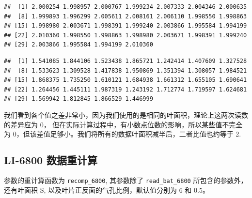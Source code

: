 \documentclass[
]{krantz}
\makeatletter
\newenvironment{Shaded}{\begin{snugshade}}{\end{snugshade}}
\newcommand{\CommentTok}[1]{\textcolor[rgb]{0.56,0.35,0.01}{\textit{#1}}}
\newcommand{\DataTypeTok}[1]{\textcolor[rgb]{0.13,0.29,0.53}{#1}}
\newcommand{\DecValTok}[1]{\textcolor[rgb]{0.00,0.00,0.81}{#1}}
\newcommand{\FloatTok}[1]{\textcolor[rgb]{0.00,0.00,0.81}{#1}}
\newcommand{\KeywordTok}[1]{\textcolor[rgb]{0.13,0.29,0.53}{\textbf{#1}}}
\newcommand{\NormalTok}[1]{#1}
\newcommand{\OperatorTok}[1]{\textcolor[rgb]{0.81,0.36,0.00}{\textbf{#1}}}
\newcommand{\StringTok}[1]{\textcolor[rgb]{0.31,0.60,0.02}{#1}}
\newenvironment{kframe}{%
\medskip{}
\setlength{\fboxsep}{.8em}
 \def\at@end@of@kframe{}%
 \ifinner\ifhmode%
  \def\at@end@of@kframe{\end{minipage}}%
  \begin{minipage}{\columnwidth}%
 \fi\fi%
 \def\FrameCommand##1{\hskip\@totalleftmargin \hskip-\fboxsep
 \colorbox{shadecolor}{##1}\hskip-\fboxsep
     \hskip-\linewidth \hskip-\@totalleftmargin \hskip\columnwidth}%
 \MakeFramed {\advance\hsize-\width
   \@totalleftmargin\z@ \linewidth\hsize
   \@setminipage}}%
 {\par\unskip\endMakeFramed%
 \at@end@of@kframe}
\renewenvironment{Shaded}{\begin{kframe}}{\end{kframe}}
\makeatother
\begin{document}
\begin{verbatim}
##  [1] 2.000254 1.998957 2.000767 1.999234 2.007333 2.004346 2.000635
##  [8] 1.999893 1.996299 2.005611 2.008161 2.006110 1.998550 1.998863
## [15] 1.998980 2.003671 1.998391 1.999240 2.003866 1.995584 1.994199
## [22] 2.010360 1.998550 1.998863 1.998980 2.003671 1.998391 1.999240
## [29] 2.003866 1.995584 1.994199 2.010360
\end{verbatim}

\begin{Shaded}
\end{Shaded}

\begin{verbatim}
##  [1] 1.541085 1.844106 1.523438 1.865721 1.242414 1.407609 1.327528
##  [8] 1.533623 1.309528 1.417838 1.950869 1.351394 1.308057 1.984521
## [15] 1.868375 1.735250 1.610121 1.684938 1.661312 1.655105 1.690641
## [22] 1.264456 1.445111 1.987319 1.243192 1.712774 1.719597 1.624681
## [29] 1.569942 1.812845 1.866529 1.446999
\end{verbatim}

我们看到各个值之差非常小，因为我们使用的是相同的叶面积，理论上这两次读数的差异应为 0， 但在实际计算过程中，有小数点位数的影响，所以某些值不完全为 0，但该差值足够小。我们将所有的数据叶面积减半后，二者比值也约等于 2.

\hypertarget{recompute6800}{%
\subsection{LI-6800 数据重计算}\label{recompute6800}}

参数的重计算函数为 \texttt{recomp\_6800}, 其参数除了 \texttt{read\_bat\_6800} 所包含的参数外，还有叶面积 S, 以及叶片正反面的气孔比例，默认值分别为 6 和 0.5。
\end{document}
